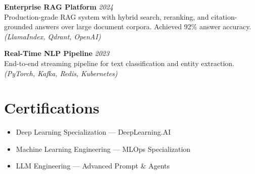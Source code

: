 \documentclass[11pt,a4paper]{article}
\begin{document}
\textbf{Enterprise RAG Platform} \hfill \textit{\color{mutedtext}2024}\\
Production-grade RAG system with hybrid search, reranking, and citation-grounded answers over large document corpora. Achieved 92\% answer accuracy. \textit{(LlamaIndex, Qdrant, OpenAI)}

\vspace{0.4em}

\textbf{Real-Time NLP Pipeline} \hfill \textit{\color{mutedtext}2023}\\
End-to-end streaming pipeline for text classification and entity extraction. \textit{(PyTorch, Kafka, Redis, Kubernetes)}

\section*{Certifications}
\begin{itemize}[leftmargin=*, itemsep=2pt]
    \item Deep Learning Specialization — DeepLearning.AI
    \item Machine Learning Engineering — MLOps Specialization
    \item LLM Engineering — Advanced Prompt \& Agents
\end{itemize}
\end{document}
